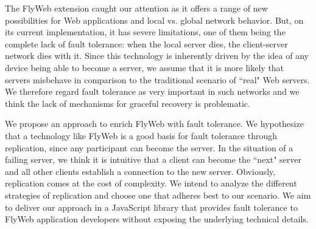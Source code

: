 The FlyWeb extension caught our attention as it offers a range of new possibilities for Web applications and local vs. global network behavior. But, on its current implementation, it has severe limitations, one of them being the complete lack of fault tolerance: when the local server dies, the client-server network dies with it. Since this technology is inherently driven by the idea of any device being able to become a server, we assume that it is more likely that servers misbehave in comparison to the traditional scenario of ``real" Web servers. We therefore regard fault tolerance as very important in such networks and we think the lack of mechanisms for graceful recovery is problematic.


We propose an approach to enrich FlyWeb with fault tolerance. We hypothesize that a technology like FlyWeb is a good basis for fault tolerance through replication, since any participant can become the server. In the situation of a failing server, we think it is intuitive that a client can become the ``next" server and all other clients establish a connection to the new server. Obviously, replication comes at the cost of complexity. We intend to analyze the different strategies of replication and choose one that adheres best to our scenario. We aim to deliver our approach in a JavaScript library \APIName{} that provides fault tolerance to FlyWeb application developers without exposing the underlying technical details.